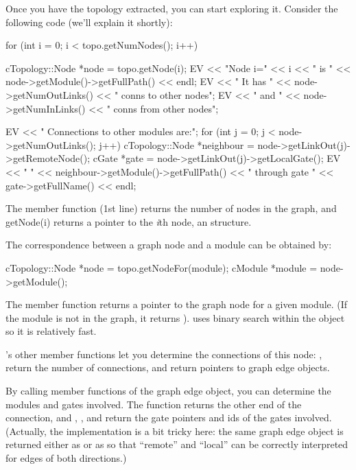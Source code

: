 Once you have the topology extracted, you can start exploring
it. Consider the following code (we'll explain it shortly):

\begin{cpp}
for (int i = 0; i < topo.getNumNodes(); i++) {
  cTopology::Node *node = topo.getNode(i);
  EV << "Node i=" << i << " is " << node->getModule()->getFullPath() << endl;
  EV << " It has " << node->getNumOutLinks() << " conns to other nodes\n";
  EV << " and " << node->getNumInLinks() << " conns from other nodes\n";

  EV << " Connections to other modules are:\n";
  for (int j = 0; j < node->getNumOutLinks(); j++) {
    cTopology::Node *neighbour = node->getLinkOut(j)->getRemoteNode();
    cGate *gate = node->getLinkOut(j)->getLocalGate();
    EV << " " << neighbour->getModule()->getFullPath()
       << " through gate " << gate->getFullName() << endl;
  }
}
\end{cpp}

The  member function (1st line) returns the number of
nodes in the graph, and getNode(i) returns a pointer to the \textit{i}th
node, an  structure.


The correspondence between a graph node and a module can be obtained
by:

\begin{cpp}
cTopology::Node *node = topo.getNodeFor(module);
cModule *module = node->getModule();
\end{cpp}


The  member function returns a pointer to the graph
node for a given module. (If the module is not in the graph, it
returns ).  uses binary search within the
 object so it is relatively fast.


's other member functions let you determine the
connections of this node: ,  return
the number of connections,  and
 return pointers to graph edge objects.


By calling member functions of the graph edge object, you can
determine the modules and gates involved. The 
function returns the other end of the connection, and
, ,  and
 return the gate pointers and ids of the gates
involved. (Actually, the implementation is a bit tricky here: the same
graph edge object  is returned either as
 or as  so that ``remote''
and ``local'' can be correctly interpreted for edges of both
directions.)





